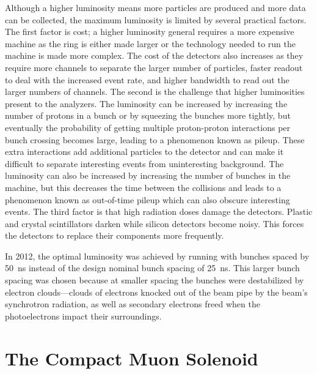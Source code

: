 Although a higher luminosity means more particles are produced and more data
can be collected, the maximum luminosity is limited by several practical
factors. The first factor is cost; a higher luminosity general requires a more
expensive machine as the ring is either made larger or the technology needed to
run the machine is made more complex. The cost of the detectors also increases
as they require more channels to separate the larger number of particles,
faster readout to deal with the increased event rate, and higher bandwidth to
read out the larger numbers of channels. The second is the challenge that
higher luminosities present to the analyzers. The luminosity can be increased
by increasing the number of protons in a bunch or by squeezing the bunches more
tightly, but eventually the probability of getting multiple proton-proton
interactions per bunch crossing becomes large, leading to a phenomenon known as
pileup. These extra interactions add additional particles to the detector and
can make it difficult to separate interesting events from uninteresting
background. The luminosity can also be increased by increasing the number of
bunches in the machine, but this decreases the time between the collisions and
leads to a phenomenon known as out-of-time pileup which can also obscure
interesting events. The third factor is that high radiation doses damage the
detectors. Plastic and crystal scintillators darken while silicon detectors
become noisy. This forces the detectors to replace their components more
frequently.

In 2012, the optimal luminosity was achieved by running with bunches spaced by
\SI{50}{\nano\second} instead of the design nominal bunch spacing of
\SI{25}{\nano\second}. This larger bunch spacing was chosen because at smaller
spacing the bunches were destabilized by electron clouds---clouds of electrons
knocked out of the beam pipe by the beam's synchrotron radiation, as well as
secondary electrons freed when the photoelectrons impact their surroundings.

\section{The Compact Muon Solenoid}
\label{sec:cms}

